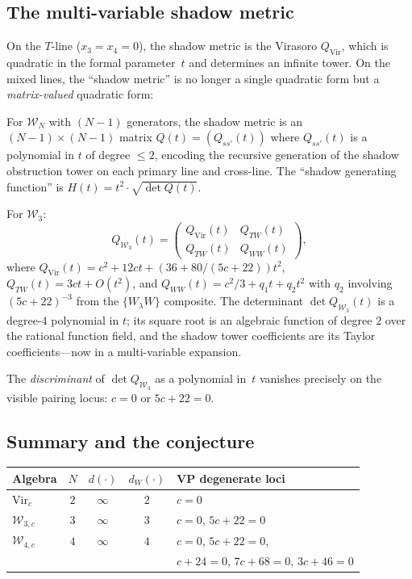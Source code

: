 \documentclass[11pt]{article}
\newcommand{\cW}{\mathcal{W}}
\begin{document}
\subsection*{The multi-variable shadow metric}

On the $T$-line ($x_3 = x_4 = 0$), the shadow metric is the
Virasoro $Q_{\mathrm{Vir}}$, which is quadratic in the formal
parameter~$t$ and determines an infinite tower.  On the mixed
lines, the ``shadow metric'' is no longer a single quadratic
form but a \emph{matrix-valued} quadratic form:

\begin{definition}
\label{def:multi-shadow-metric}
For $\cW_N$ with $(N{-}1)$ generators, the shadow metric is an
$(N{-}1) \times (N{-}1)$ matrix $Q(t) = (Q_{ss'}(t))$ where
$Q_{ss'}(t)$ is a polynomial in $t$ of degree $\le 2$, encoding
the recursive generation of the shadow obstruction tower on each primary
line and cross-line.  The ``shadow generating function'' is
$H(t) = t^2 \cdot \sqrt{\det Q(t)}$.
\end{definition}

For $\cW_3$:
\[
Q_{\cW_3}(t) = \begin{pmatrix}
Q_{\mathrm{Vir}}(t) & Q_{TW}(t) \\ Q_{TW}(t) & Q_{WW}(t)
\end{pmatrix},
\]
where $Q_{\mathrm{Vir}}(t) = c^2 + 12ct + (36 + 80/(5c{+}22))t^2$,
$Q_{TW}(t) = 3ct + O(t^2)$, and
$Q_{WW}(t) = c^2/3 + q_1 t + q_2 t^2$ with
$q_2$ involving $(5c{+}22)^{-3}$ from the $\{W_\lambda W\}$
composite.  The determinant $\det Q_{\cW_3}(t)$ is a degree-$4$
polynomial in $t$; its square root is an algebraic function of
degree $2$ over the rational function field, and the shadow
tower coefficients are its Taylor coefficients---now in a
multi-variable expansion.

The \emph{discriminant} of $\det Q_{\cW_3}$ as a polynomial
in~$t$ vanishes precisely on the visible pairing locus:
$c = 0$ or $5c + 22 = 0$.

\subsection*{Summary and the conjecture}

\begin{center}
\renewcommand{\arraystretch}{1.25}
\begin{tabular}{lcccl}
\hline
\textbf{Algebra} & $N$ & $d(\cdot)$ & $d_W(\cdot)$
  & \textbf{VP degenerate loci} \\
\hline
$\mathrm{Vir}_c$ & $2$ & $\infty$ & $2$
  & $c = 0$ \\
$\cW_{3,c}$ & $3$ & $\infty$ & $3$
  & $c = 0$, $5c+22 = 0$ \\
$\cW_{4,c}$ & $4$ & $\infty$ & $4$
  & $c = 0$, $5c+22 = 0$, \\
& & & & $c+24 = 0$, $7c+68 = 0$, $3c+46 = 0$ \\
\hline
\end{tabular}
\end{center}
\end{document}
